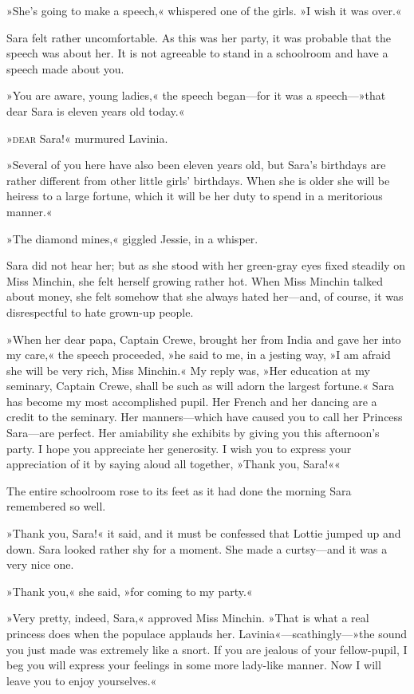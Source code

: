 »She's going to make a speech,« whispered one of the girls. »I wish it was over.«

Sara felt rather uncomfortable. As this was her party, it was probable that the speech was about her. It is not agreeable to stand in a schoolroom and have a speech made about you.

»You are aware, young ladies,« the speech began—for it was a speech—»that dear Sara is eleven years old today.«

»\textsc{dear} Sara!« murmured Lavinia.

»Several of you here have also been eleven years old, but Sara's birthdays are rather different from other little girls' birthdays. When she is older she will be heiress to a large fortune, which it will be her duty to spend in a meritorious manner.«

»The diamond mines,« giggled Jessie, in a whisper.

Sara did not hear her; but as she stood with her green-gray eyes fixed steadily on Miss Minchin, she felt herself growing rather hot. When Miss Minchin talked about money, she felt somehow that she always hated her—and, of course, it was disrespectful to hate grown-up people.

»When her dear papa, Captain Crewe, brought her from India and gave her into my care,« the speech proceeded, »he said to me, in a jesting way, »I am afraid she will be very rich, Miss Minchin.« My reply was, »Her education at my seminary, Captain Crewe, shall be such as will adorn the largest fortune.« Sara has become my most accomplished pupil. Her French and her dancing are a credit to the seminary. Her manners—which have caused you to call her Princess Sara—are perfect. Her amiability she exhibits by giving you this afternoon's party. I hope you appreciate her generosity. I wish you to express your appreciation of it by saying aloud all together, »Thank you, Sara!««

The entire schoolroom rose to its feet as it had done the morning Sara remembered so well.

»Thank you, Sara!« it said, and it must be confessed that Lottie jumped up and down. Sara looked rather shy for a moment. She made a curtsy—and it was a very nice one.

»Thank you,« she said, »for coming to my party.«

»Very pretty, indeed, Sara,« approved Miss Minchin. »That is what a real princess does when the populace applauds her. Lavinia«—scathingly—»the sound you just made was extremely like a snort. If you are jealous of your fellow-pupil, I beg you will express your feelings in some more lady-like manner. Now I will leave you to enjoy yourselves.«

